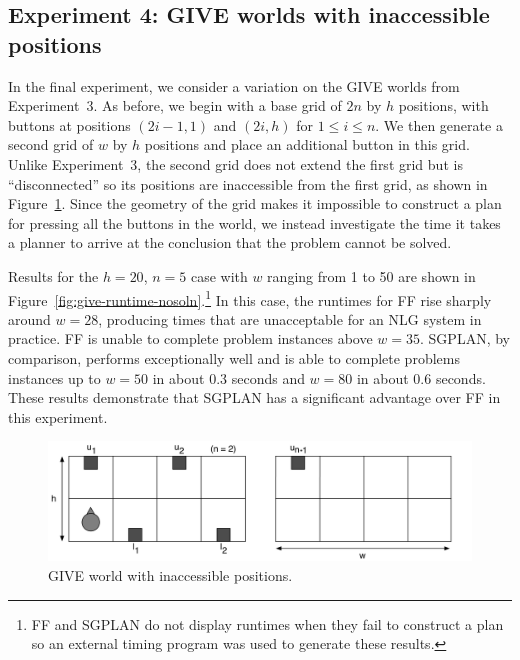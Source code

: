 \documentclass[letterpaper]{article}
\begin{document}
\subsection{Experiment 4: GIVE worlds with inaccessible positions}
\label{sec:experiment-4:-give}

In the final experiment, we consider a variation on the GIVE worlds from
Experiment~3. As before, we begin with a base grid of $2n$ by $h$
positions, with buttons at positions $(2i-1,1)$ and $(2i,h)$ for $1 \leq i
\leq n$. We then generate a second grid of $w$ by $h$ positions and place
an additional button in this grid. Unlike Experiment~3, the second grid
does not extend the first grid but is ``disconnected'' so its positions are
inaccessible from the first grid, as shown in
Figure~\ref{fig:give-junk-nosoln}. Since the geometry of the grid makes it
impossible to construct a plan for pressing all the buttons in the world,
we instead investigate the time it takes a planner to arrive at the
conclusion that the problem cannot be solved.

Results for the $h=20$, $n=5$ case with $w$ ranging from 1 to 50 are shown
in Figure~\ref{fig:give-runtime-nosoln}.\footnote{FF and SGPLAN do
 not display runtimes when they fail to construct a plan so an external timing
 program was used to generate these results.}
In this case, the runtimes for FF rise sharply around $w=28$, producing
times that are unacceptable for an NLG system in practice. FF is unable
to complete problem instances above $w=35$. SGPLAN, by comparison, performs
exceptionally well and is able to complete problems instances up to $w=50$
in about 0.3 seconds and $w=80$ in about 0.6 seconds. These results
demonstrate that SGPLAN has a significant advantage over FF in this
experiment. 

\begin{figure}[t]
  \centering
  \includegraphics[width=0.85\columnwidth]{pic-empty-inaccessible}
  \caption{GIVE world with inaccessible positions.}
  \label{fig:give-junk-nosoln}
\end{figure}
\end{document}
